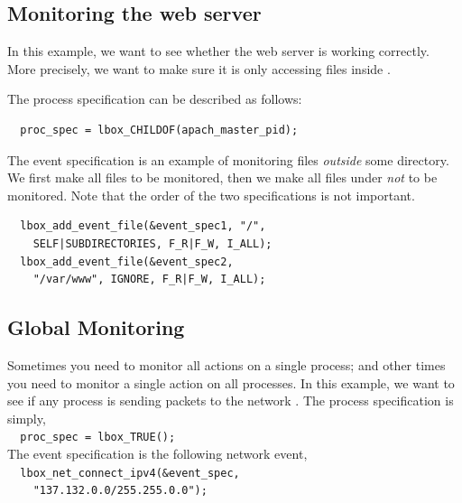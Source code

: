 

\subsection{Monitoring the web server}

In this example, we want to see whether the web server is working correctly.
More precisely, we want to make sure it is only accessing files inside
.

The process specification can be described as follows:
{
\small
\begin{verbatim}
  proc_spec = lbox_CHILDOF(apach_master_pid);
\end{verbatim}
}
\noindent
The event specification is an example of
monitoring files {\em outside} some directory.
We first make all files to be monitored, then we make
all files under  {\em not} to be monitored.
Note that the order of the two specifications is not important.
{
\small
\begin{verbatim}
  lbox_add_event_file(&event_spec1, "/",
    SELF|SUBDIRECTORIES, F_R|F_W, I_ALL);
  lbox_add_event_file(&event_spec2,
    "/var/www", IGNORE, F_R|F_W, I_ALL);
\end{verbatim}
}

\subsection{Global Monitoring}

Sometimes you need to monitor all actions on a single process;
and other times you need to monitor a single action on all processes.
In this example, we want to see if any process is sending packets
to the network .
The process specification is simply, \\
{\small\verb|  proc_spec = lbox_TRUE();|} \\
The event specification is the following network event, \\
{\small\verb|  lbox_net_connect_ipv4(&event_spec,|} \\
{\small\verb|    "137.132.0.0/255.255.0.0");|}

